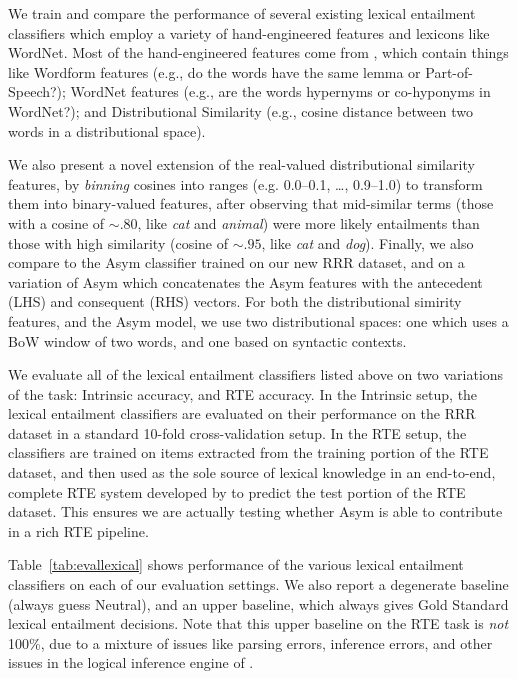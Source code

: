 \documentclass[12pt]{article}
\begin{document}
We train and compare the performance of several existing lexical entailment
classifiers which employ a variety of hand-engineered features and lexicons
like WordNet.  Most of the hand-engineered features come from
, which contain things like Wordform features (e.g.,
do the words have the same lemma or Part-of-Speech?); WordNet features (e.g.,
are the words hypernyms or co-hyponyms in WordNet?); and Distributional
Similarity (e.g., cosine distance between two words in a distributional space).

We also present a novel extension of the real-valued distributional similarity
features, by {\em binning} cosines into ranges (e.g. 0.0--0.1, \ldots, 0.9--1.0)
to transform them into binary-valued features, after observing that
mid-similar terms (those with a cosine of $\sim.80$, like {\em cat} and {\em
animal}) were more likely entailments than those with high similarity
(cosine of $\sim.95$, like {\em cat} and {\em dog}).
Finally, we also compare to the Asym classifier trained on our new RRR dataset,
and on a variation of Asym which concatenates the Asym features with the
antecedent (LHS) and consequent (RHS) vectors. For both the distributional
simirity features, and the Asym model, we use two distributional spaces:
one which uses a BoW window of two words, and one based on syntactic contexts.

We evaluate all of the lexical entailment classifiers listed above on two
variations of the task: Intrinsic accuracy, and RTE accuracy. In the Intrinsic
setup, the lexical entailment classifiers are evaluated on their performance on
the RRR dataset in a standard 10-fold cross-validation setup. In the RTE setup,
the classifiers are trained on items extracted from the training portion of the
RTE dataset, and then used as the sole source of lexical knowledge in an
end-to-end, complete RTE system developed by  to
predict the test portion of the RTE dataset. This ensures we are actually
testing whether Asym is able to contribute in a rich RTE pipeline.

Table~\ref{tab:evallexical} shows performance of the various lexical entailment
classifiers on each of our evaluation settings. We also report a degenerate
baseline (always guess Neutral), and an upper baseline, which always gives Gold
Standard lexical entailment decisions. Note that this upper baseline on the RTE
task is {\em not} 100\%, due to a mixture of issues like parsing errors,
inference errors, and other issues in the logical inference engine of
.
\end{document}
